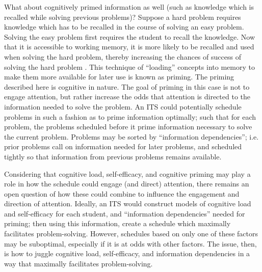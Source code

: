 \documentclass[hidelinks,11pt]{article}
\begin{document}
What about cognitively primed information as well (such as knowledge which is
recalled while solving previous problems)?  Suppose a hard problem requires
knowledge which has to be recalled in the course of solving an easy problem.
Solving the easy problem first requires the student to recall the knowledge.
Now that it is accessible to working memory, it is more likely to be recalled
and used when solving the hard problem, thereby increasing the chances of
success of solving the hard problem {\citep{jraidi2011}}.  This technique of
``loading'' concepts into memory to make them more available for later use is
known as priming.  The priming described here is cognitive in nature.  The goal
of priming in this case is not to engage attention, but rather increase the
odds that attention is directed to the information needed to solve the problem.
An ITS could potentially schedule problems in such a fashion as to prime
information optimally; such that for each problem, the problems scheduled
before it prime information necessary to solve the current problem. Problems
may be sorted by ``information dependencies''; i.e. prior problems call on
information needed for later problems, and scheduled tightly so that
information from previous problems remains available.

Considering that cognitive load, self-efficacy, and cognitive priming may play
a role in how the schedule could engage (and direct) attention, there remains
an open question of how these could combine to influence the engagement and
direction of attention. Ideally, an ITS would construct models of cognitive
load and self-efficacy for each student, and ``information dependencies''
needed for priming; then using this information, create a schedule which
maximally facilitates problem-solving. However, schedules based on only one of
these factors may be suboptimal, especially if it is at odds with other
factors.  The issue, then, is how to juggle cognitive load, self-efficacy, and
information dependencies in a way that maximally facilitates problem-solving.
\end{document}
